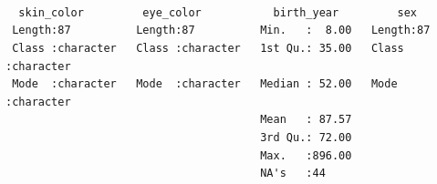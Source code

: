 \documentclass[
  letterpaper,
  DIV=11,
  numbers=noendperiod]{scrreprt}
\begin{document}
\begin{verbatim}
                                                                        
                                                                        
                                                                        
  skin_color         eye_color           birth_year         sex           
 Length:87          Length:87          Min.   :  8.00   Length:87         
 Class :character   Class :character   1st Qu.: 35.00   Class :character  
 Mode  :character   Mode  :character   Median : 52.00   Mode  :character  
                                       Mean   : 87.57                     
                                       3rd Qu.: 72.00                     
                                       Max.   :896.00                     
                                       NA's   :44                         
                                                                          
                                                                          
                                                                          
                                                                          
                                                                          
                                                                          
                                                                          
                                                                          
                                                                          
                                                                          
                                                                          
                                                                          
                                                                          
                                                                          
                                                                          
                                                                          
                                                                          
                                                                          
                                                                          

\end{verbatim}
\end{document}
